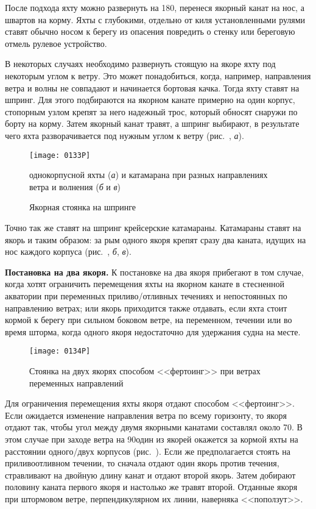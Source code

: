 После подхода яхту можно развернуть на 180\gr, перенеся якорный канат на нос, а швартов на корму. Яхты с глубокими, отдельно от киля установленными рулями ставят обычно носом к берегу из опасения повредить о стенку или береговую отмель рулевое устройство.

В некоторых случаях необходимо развернуть стоящую на якоре яхту под некоторым углом к ветру. Это может понадобиться, когда, например, направления ветра и волны не совпадают и начинается бортовая качка. Тогда яхту ставят на шпринг. Для этого подбираются на якорном канате примерно на один корпус, стопорным узлом крепят за него надежный трос, который обносят снаружи по борту на корму. Затем якорный канат травят, а шпринг выбирают, в результате чего яхта разворачивается под нужным углом к ветру (рис.~, \textit{а}).

\begin{figure*}[htb]
  \centering{}
  \texttt{[image: 0133P]}
  \caption{Якорная стоянка на шпринге}
  \label{fig:133}
  \small
  \centering{}
  однокорпусной яхты (\textit{а}) и катамарана при разных направлениях ветра и волнения (\textit{б} и \textit{в})
\end{figure*}

Точно так же ставят на шпринг крейсерские катамараны. Катамараны ставят на якорь и таким образом: за рым одного якоря крепят сразу два каната, идущих на нос каждого корпуса (рис.~, \textit{б}, \textit{в}). 

\textbf{Постановка на два якоря.} К постановке на два якоря прибегают в том случае, когда хотят ограничить перемещения яхты на якорном канате в стесненной акватории при переменных приливо\-/отливных течениях и непостоянных по направлению ветрах; или якорь приходится также отдавать, если яхта стоит кормой к берегу при сильном боковом ветре, на переменном, течении или во время шторма, когда одного якоря недостаточно для удержания судна на месте.

\begin{figure*}[htb]
  \centering{}
  \texttt{[image: 0134P]}
  \caption{Стоянка на двух якорях способом <<фертоинг>> при ветрах переменных направлений}
  \label{fig:134}
\end{figure*}

Для ограничения перемещения яхты якоря отдают способом <<фертоинг>>. Если ожидается изменение направления ветра по всему горизонту, то якоря отдают так, чтобы угол между двумя якорными канатами составлял около 70\gr. В этом случае при заходе ветра на 90\gr один из якорей окажется за кормой яхты на расстоянии одного\-/двух корпусов (рис.~). Если же предполагается стоять на приливоотливном течении, то сначала отдают один якорь против течения, стравливают на двойную длину канат и отдают второй якорь. Затем добирают половину каната первого якоря и настолько же травят второй. Отданные якоря при штормовом ветре, перпендикулярном их линии, наверняка <<поползут>>.

